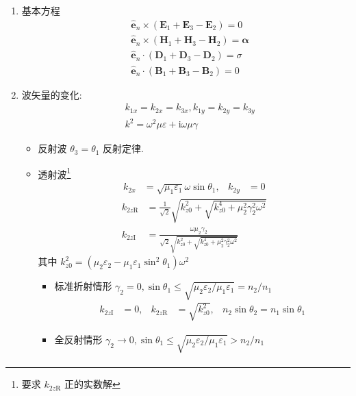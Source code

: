 \documentclass[12pt,a4paper]{article}%
\numberwithin{equation}{section}%
\renewcommand*{\vec}[1]{\bm{#1}}%
\newcommand\mi{\mathrm{i}}
\newcommand*{\uvec}[1]{\hat{\vec{#1}}}
\begin{document}
\begin{enumerate}
    \item 基本方程
    \begin{align}
        &\uvec e_n\times(\vec E_1 + \vec E_3 - \vec E_2) = 0 \\
        &\uvec e_n\times(\vec H_1 + \vec H_3 - \vec H_2) = \vec \alpha \\
        &\uvec e_n\cdot(\vec D_1 + \vec D_3 - \vec D_2) = \sigma \\
        &\uvec e_n\cdot(\vec B_1 + \vec B_3 - \vec B_2) = 0
    \end{align}
    \item 波矢量的变化: 
    \begin{align}
        &k_{1x} = k_{2x} = k_{3x}, k_{1y} = k_{2y} = k_{3y}\\
        &k^2 = \omega^2\mu\varepsilon + \mi\omega\mu\gamma
    \end{align}
     \begin{itemize}
         \item 反射波 $\theta_3 = \theta_1$ 反射定律.
         \item 透射波\footnote{要求 $k_{2z\mathrm R}$ 正的实数解} 
         \begin{align}
             k_{2x} &= \sqrt{\mu_1\varepsilon_1}\omega\sin\theta_1, &k_{2y} &= 0
         \end{align}
         \begin{align}
             k_{2z\mathrm R} &= \frac1{\sqrt 2}\sqrt{k_{z0}^2 + \sqrt{k_{z0}^4 + \mu_2^2\gamma_2^2\omega^2}} \\
             k_{2z\mathrm I} &= \frac{\omega\mu_2\gamma_2}{\sqrt2\sqrt{k_{z0}^2 + \sqrt{k_{z0}^4 + \mu_2^2\gamma_2^2\omega^2}}}
         \end{align}
         其中 $k_{z0}^2 =(\mu_2\varepsilon_2 - \mu_1\varepsilon_1\sin^2\theta_1)\omega^2$
         \begin{itemize}
             \item 标准折射情形 $\gamma_2 = 0, \sin\theta_1\le\sqrt{\mu_2\varepsilon_2/\mu_1\varepsilon_1} = n_2/n_1$ 
             \begin{align}
                 k_{2z\mathrm I} &= 0,& k_{2z\mathrm R} &= \sqrt{k_{z0}^2}, &n_2\sin\theta_2 = n_1\sin\theta_1
             \end{align}
             \item 全反射情形 $\gamma_2 \to 0, \sin\theta_1\le\sqrt{\mu_2\varepsilon_2/\mu_1\varepsilon_1} > n_2/n_1$ 
             \begin{align}

\end{align}
\end{itemize}
\end{itemize}
\end{enumerate}
\end{document}
